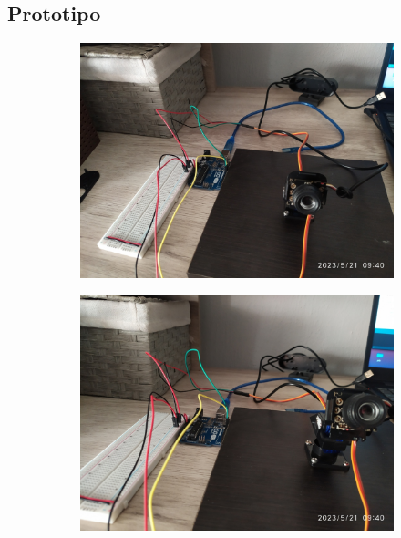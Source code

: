 \documentclass[12pt, oneside]{article}
\begin{document}
\subsection{Prototipo}
{\sffamily\large\justify
    \begin{figure}[h!]
        \centering

        \begin{subfigure}[tl]{0.45\textwidth}
            \centering
            \includegraphics[width=\linewidth]{figs/IMG_20230521_094003.jpg}
        \end{subfigure}
        \begin{subfigure}[tr]{0.45\textwidth}
            \centering
            \includegraphics[width=\linewidth]{figs/IMG_20230521_094011.jpg}

\end{subfigure}
\end{figure}}
\end{document}
